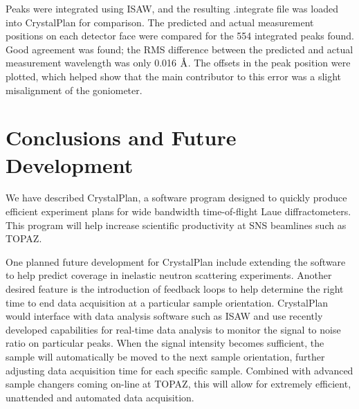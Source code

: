 \documentclass[final]{iucr}              %
\newcommand{\ang}{$\mathrm{\AA} $}
\begin{document}
Peaks were integrated using ISAW, and the resulting .integrate file was loaded
into CrystalPlan for comparison. The predicted and actual measurement
positions on each detector face were compared for the 554 integrated peaks
found. Good agreement was found; the RMS difference between the predicted and
actual measurement wavelength was only 0.016 \ang. The offsets in the peak
position were plotted, which helped show that the main contributor to this error
was a slight misalignment of the goniometer.





\section{Conclusions and Future Development}

We have described CrystalPlan, a software program designed to quickly produce
efficient experiment plans for wide bandwidth time-of-flight Laue
diffractometers. This program will help increase scientific productivity at SNS
beamlines such as TOPAZ.

One planned future development for CrystalPlan include extending the software
to help predict coverage in inelastic neutron scattering experiments. Another
desired feature is the introduction of feedback loops to help determine the
right time to end data acquisition at a particular sample orientation.
CrystalPlan would interface with data analysis software such as ISAW and use
recently developed capabilities for real-time data analysis to monitor
the  signal to noise ratio on particular peaks. When the signal intensity
becomes sufficient, the sample will automatically be moved to the next sample
orientation, further adjusting data acquisition time for each specific sample.
Combined with advanced sample changers coming on-line at TOPAZ, this will allow
for extremely efficient, unattended and automated data acquisition.
\end{document}

